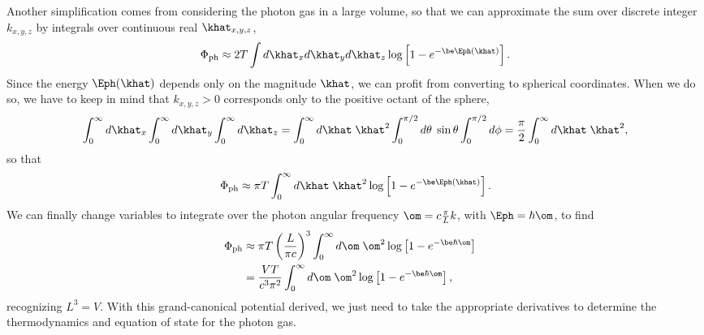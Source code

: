 Another simplification comes from considering the photon gas in a large volume, so that we can approximate the sum over discrete integer $k_{x, y, z}$ by integrals over continuous real $\khat_{x, y, z}$,
\begin{equation*}
  \Phi_{\text{ph}} \approx 2T \int d\khat_x d\khat_y d\khat_z \log\left[1 - e^{-\be \Eph(\khat)}\right].
\end{equation*}
Since the energy $\Eph(\khat)$ depends only on the magnitude $\khat$, we can profit from converting to spherical coordinates.
When we do so, we have to keep in mind that $k_{x, y, z} > 0$ corresponds only to the positive octant of the sphere,
\begin{equation*}
  \int_0^{\infty} d\khat_x \int_0^{\infty} d\khat_y \int_0^{\infty} d\khat_z = \int_0^{\infty} d\khat \; \khat^2 \int_0^{\pi / 2} d\theta \; \sin\theta \int_0^{\pi / 2} d\phi = \frac{\pi}{2} \int_0^{\infty} d\khat \; \khat^2,
\end{equation*}
so that
\begin{equation*}
  \Phi_{\text{ph}} \approx \pi T \int_0^{\infty} d\khat \; \khat^2 \log\left[1 - e^{-\be \Eph(\khat)}\right].
\end{equation*}
We can finally change variables to integrate over the photon angular frequency $\om = c \frac{\pi}{L} k$, with $\Eph = \hbar \om$, to find
\begin{align}
  \Phi_{\text{ph}} & \approx \pi T \left(\frac{L}{\pi c}\right)^3 \int_0^{\infty} d\om \; \om^2 \log\left[1 - e^{-\be \hbar \om}\right] \cr
                   & = \frac{VT}{c^3 \pi^2} \int_0^{\infty} d\om \; \om^2 \log\left[1 - e^{-\be \hbar \om}\right], \label{eq:photon_grand}
\end{align}
recognizing $L^3 = V$.
With this grand-canonical potential derived, we just need to take the appropriate derivatives to determine the thermodynamics and equation of state for the photon gas.



